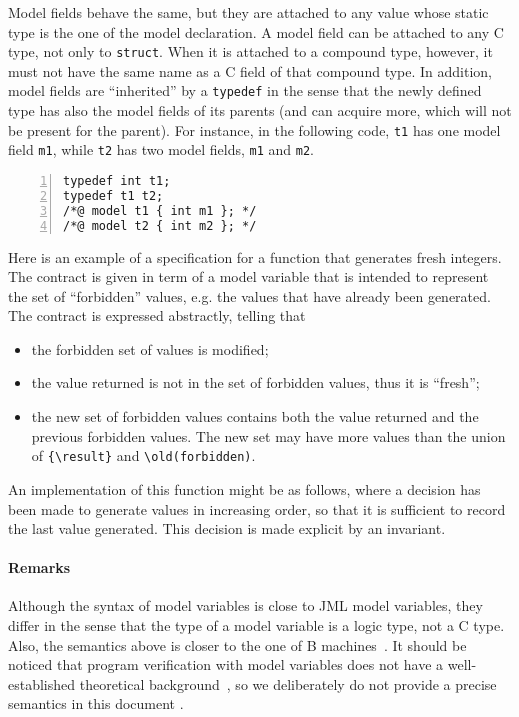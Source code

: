 Model fields behave the same, but they are attached to any value whose static
type is the one of the model declaration. A model field can be attached to any
C type, not only to \texttt{struct}. When it is attached to a compound type,
however, it must not have the same name as a C field of that compound type.
In addition, model fields are ``inherited'' by a \texttt{typedef} 
in the sense that the newly defined type has also the model fields of its
parents (and can acquire more, which will not be present for the parent).
For instance, in the following code, \texttt{t1} has one model field
\texttt{m1}, while \texttt{t2} has two model fields,
\texttt{m1} and \texttt{m2}.
\begin{lstlisting}[style=c,basicstyle=\lp@basic,numbers=left]
typedef int t1;
typedef t1 t2;
/*@ model t1 { int m1 }; */
/*@ model t2 { int m2 }; */
\end{lstlisting}

\begin{example}\label{ex:model}
  Here is an example of a specification for a function that generates
  fresh integers. The contract is given in term of a model variable
  that is intended to represent the set of ``forbidden'' values,
  e.g. the values that have already been generated.
  The contract is expressed abstractly, telling that
  \begin{itemize}
  \item the forbidden set of values is modified;
  \item the value returned is not in the set of forbidden values, thus
    it is ``fresh'';
  \item the new set of forbidden values contains both the value
    returned and the previous forbidden values.
    The new set may have more values than the union of \lstinline|{\result}| 
    and \lstinline|\old(forbidden)|.
  \end{itemize}
  An implementation of this function might be as follows, where a
  decision has been made to generate values in increasing order, so
  that it is sufficient to record the last value generated. This decision
  is made explicit by an invariant.
\end{example}

\paragraph{Remarks}

Although the syntax of model variables is close to JML model
variables, they differ in the sense that the type of a model variable
is a logic type, not a C type. Also, the semantics above is closer to
the one of B machines~\cite{abrial96:_b_book}. It should be noticed
that program verification with model variables does not have a
well-established theoretical background~\cite{marche07,leavens07}, so
we deliberately do not provide a precise semantics in this document .



